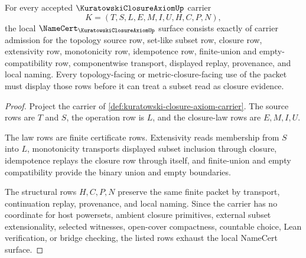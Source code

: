 \begin{theorem}
\label{thm:kuratowski-closure-axiom-namecert-obligations}
For every accepted $\KuratowskiClosureAxiomUp$ carrier
$$
K=(T,S,L,E,M,I,U,H,C,P,N),
$$
the local $\NameCert_{\KuratowskiClosureAxiomUp}$ surface consists exactly of carrier admission for the topology source row, set-like subset row, closure row, extensivity row, monotonicity row, idempotence row, finite-union and empty-compatibility row, componentwise transport, displayed replay, provenance, and local naming. Every topology-facing or metric-closure-facing use of the packet must display those rows before it can treat a subset read as closure evidence.
\end{theorem}
\begin{proof}
Project the carrier of \autoref{def:kuratowski-closure-axiom-carrier}. The source rows are $T$ and $S$, the operation row is $L$, and the closure-law rows are $E,M,I,U$.

The law rows are finite certificate rows. Extensivity reads membership from $S$ into $L$, monotonicity transports displayed subset inclusion through closure, idempotence replays the closure row through itself, and finite-union and empty compatibility provide the binary union and empty boundaries.

The structural rows $H,C,P,N$ preserve the same finite packet by transport, continuation replay, provenance, and local naming. Since the carrier has no coordinate for host powersets, ambient closure primitives, external subset extensionality, selected witnesses, open-cover compactness, countable choice, Lean verification, or bridge checking, the listed rows exhaust the local NameCert surface.
\end{proof}

